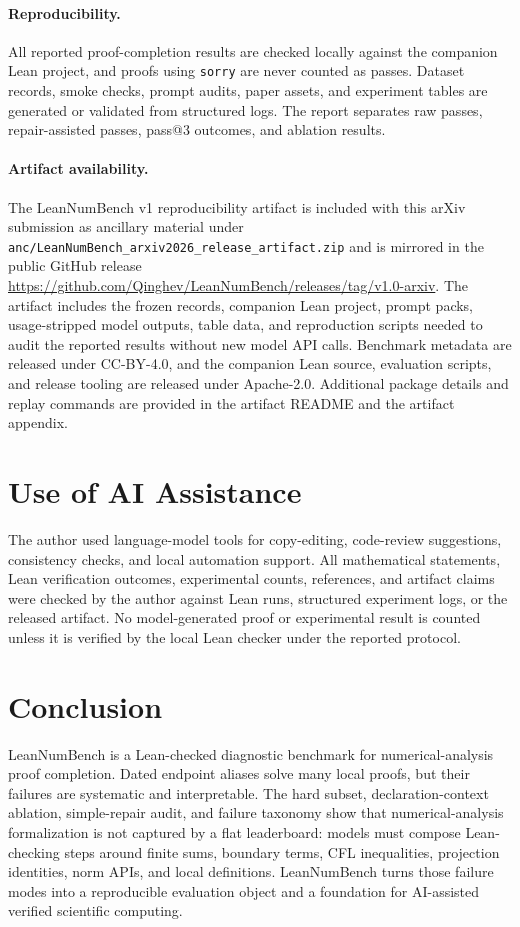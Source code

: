 \documentclass{article}
\begin{document}
\paragraph{Reproducibility.}
All reported proof-completion results are checked locally against the
companion Lean project, and proofs using \texttt{sorry} are never counted as
passes. Dataset records, smoke checks, prompt audits, paper assets, and
experiment tables are generated or validated from structured logs. The report
separates raw passes, repair-assisted passes, pass@3 outcomes, and ablation
results.

\paragraph{Artifact availability.}
The LeanNumBench v1 reproducibility artifact is included with this arXiv
submission as ancillary material under
\texttt{anc/LeanNumBench\_arxiv2026\_release\_artifact.zip} and is mirrored in
the public GitHub release
\url{https://github.com/Qinghev/LeanNumBench/releases/tag/v1.0-arxiv}. The
artifact includes the frozen records, companion Lean project, prompt packs,
usage-stripped model outputs, table data, and reproduction scripts needed to
audit the reported results without new model API calls. Benchmark metadata are
released under CC-BY-4.0, and the companion Lean source, evaluation scripts,
and release tooling are released under Apache-2.0. Additional package details
and replay commands are provided in the artifact README and the artifact
appendix.

\section*{Use of AI Assistance}

The author used language-model tools for copy-editing, code-review
suggestions, consistency checks, and local automation support. All
mathematical statements, Lean verification outcomes, experimental counts,
references, and artifact claims were checked by the author against
Lean runs, structured experiment logs, or the released artifact. No
model-generated proof or experimental result is counted unless it is verified
by the local Lean checker under the reported protocol.

\section{Conclusion}

LeanNumBench is a Lean-checked diagnostic benchmark for numerical-analysis proof
completion. Dated endpoint aliases solve many local proofs, but their failures
are systematic and interpretable. The hard subset, declaration-context
ablation, simple-repair audit, and failure taxonomy show that
numerical-analysis formalization is not captured by a flat leaderboard:
models must compose Lean-checking steps around finite sums, boundary terms,
CFL inequalities, projection identities, norm APIs, and local definitions.
LeanNumBench turns those failure modes into a reproducible evaluation object
and a foundation for AI-assisted verified scientific computing.




\clearpage
\appendix

\end{document}
